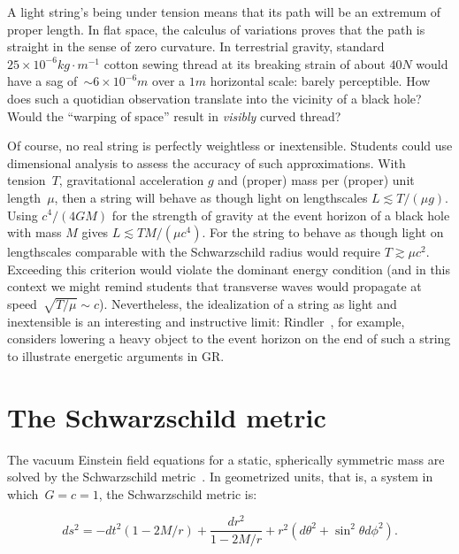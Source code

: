 \documentclass[review]{elsarticle}
\begin{document}
A light string's being under tension means that its path will be an
extremum of proper length.  In flat space, the calculus of variations
proves that the path is straight in the sense of zero curvature.  In
terrestrial gravity, standard $25\times
10^{-6}\unit{kg}\cdot\unit{m}^{-1}$ cotton sewing thread at its breaking
strain of about $40\unit{N}$ would have a sag of~$\sim 6\times
10^{-6}\unit{m}$ over a $1\unit{m}$ horizontal scale: barely perceptible.
How does such a quotidian observation translate into the vicinity of a
black hole?  Would the ``warping of space'' result in {\em visibly}
curved thread?

Of course, no real string is perfectly weightless or inextensible.
Students could use dimensional analysis to assess the accuracy of such
approximations.  With tension~$T$, gravitational acceleration $g$ and
(proper) mass per (proper) unit length~$\mu$, then a string will
behave as though light on lengthscales $L\lesssim T/\left(\mu
g\right)$.  Using $c^4/\left(4GM\right)$ for the strength of gravity
at the event horizon of a black hole with mass $M$ gives $L\lesssim
TM/\left(\mu c^4\right)$.  For the string to behave as though light on
lengthscales comparable with the Schwarzschild radius would require
$T\gtrsim\mu c^2$.  Exceeding this criterion would violate the
dominant energy condition (and in this context we might remind
students that transverse waves would propagate at
speed~$\sqrt{T/\mu}\sim c$).  Nevertheless, the idealization of a
string as light and inextensible is an interesting and instructive
limit: Rindler~\cite{rindler}, for example, considers lowering a heavy
object to the event horizon on the end of such a string to illustrate
energetic arguments in GR.

\section{The Schwarzschild metric}

The vacuum Einstein field equations for a static, spherically
symmetric mass are solved by the Schwarzschild
metric~\cite{schwarzschild1916}.  In geometrized units, that is, a
system in which~$G=c=1$, the Schwarzschild metric is:

\begin{equation}\label{schwarzschild}
ds^2= -dt^2\left(1-2M/r\right) +\frac{dr^2}{1-2M/r} + r^2\left(d\theta^2 + \sin^2\theta d\phi^2\right).
\end{equation}
\end{document}
